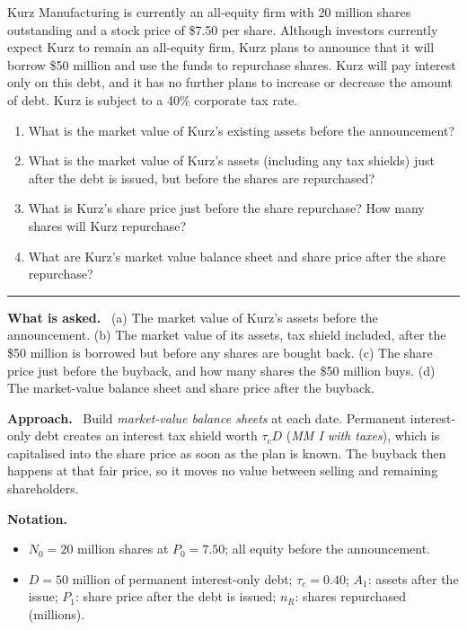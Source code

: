\documentclass[11pt,a4paper]{article}
\numberwithin{equation}{section}
\newcommand{\notation}{\par\smallskip\noindent\textbf{Notation.}}
\newcommand{\asked}{\par\medskip\noindent\textbf{What is asked.}~}
\newcommand{\approach}{\par\smallskip\noindent\textbf{Approach.}~}
\newcommand{\stmtend}{\par\endgroup\nopagebreak\noindent\rule{\linewidth}{0.4pt}\par\medskip}
\begin{document}
Kurz Manufacturing is currently an all-equity firm with 20 million shares outstanding and a stock
price of \$7.50 per share. Although investors currently expect Kurz to remain an all-equity firm,
Kurz plans to announce that it will borrow \$50 million and use the funds to repurchase shares. Kurz
will pay interest only on this debt, and it has no further plans to increase or decrease the amount
of debt. Kurz is subject to a 40\% corporate tax rate.

\begin{enumerate}
\def\labelenumi{\alph{enumi}.}
\item
  What is the market value of Kurz's existing assets before the announcement?
\item
  What is the market value of Kurz's assets (including any tax shields) just after the debt is
  issued, but before the shares are repurchased?
\item
  What is Kurz's share price just before the share repurchase? How many shares will Kurz repurchase?
\item
  What are Kurz's market value balance sheet and share price after the share repurchase?
\end{enumerate}
\stmtend

\asked
(a) The market value of Kurz's assets before the announcement.
(b) The market value of its assets, tax shield included, after the \$50 million is borrowed but
before any shares are bought back.
(c) The share price just before the buyback, and how many shares the \$50 million buys.
(d) The market-value balance sheet and share price after the buyback.

\approach
Build \emph{market-value balance sheets} at each date. Permanent interest-only debt creates an
interest tax shield worth $\tau_cD$ (\emph{MM I with taxes}), which is capitalised into the share
price as soon as the plan is known. The buyback then happens at that fair price, so it moves no
value between selling and remaining shareholders.

\notation
\begin{itemize}
  \item $N_0=20$ million shares at $P_0=7.50$; all equity before the announcement.
  \item $D=50$ million of permanent interest-only debt; $\tau_c=0.40$; $A_1$: assets after the issue; $P_1$: share price after the debt is issued; $n_R$: shares repurchased (millions).
\end{itemize}
\end{document}
